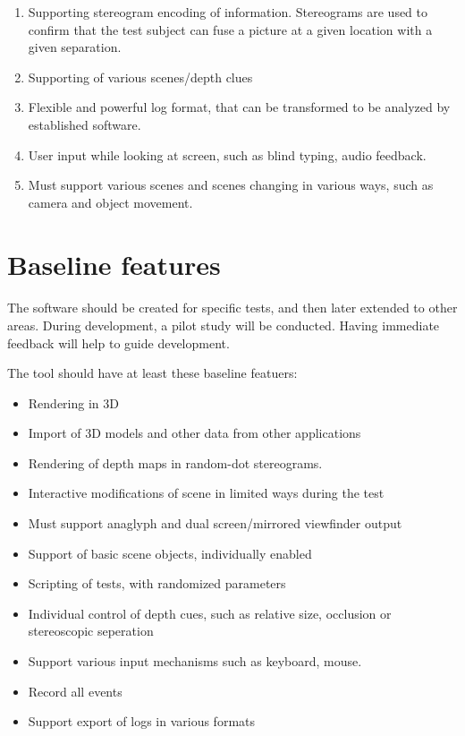 \documentclass[11pt]{scrartcl}
\begin{document}
\begin{multicols}{2}
\begin{enumerate}
\item Supporting stereogram encoding of information. Stereograms are used to confirm that the test subject can fuse a picture at a given location with a given separation.
\item Supporting of various scenes/depth clues
\item Flexible and powerful log format, that can be transformed to be analyzed by established software.
\item User input while looking at screen, such as blind typing, audio feedback.
\item Must support various scenes and scenes changing in various ways, such as camera and object movement.
\end{enumerate}

\section{Baseline features}
\paragraph{}
The software should be created for specific tests, and then later extended to other areas. During development, a pilot study will be conducted. Having immediate feedback will help to guide development.

The tool should have at least these baseline featuers:

\begin{itemize}
\item Rendering in 3D
\item Import of 3D models and other data from other applications
\item Rendering of depth maps in random-dot stereograms.
\item Interactive modifications of scene in limited ways during the test
\item Must support anaglyph and dual screen/mirrored viewfinder output
\item Support of basic scene objects, individually enabled
\item Scripting of tests, with randomized parameters
\item Individual control of depth cues, such as relative size, occlusion or stereoscopic seperation
\item Support various input mechanisms such as keyboard, mouse.
\item Record all events
\item Support export of logs in various formats
\end{itemize}


\end{multicols}
\end{document}

